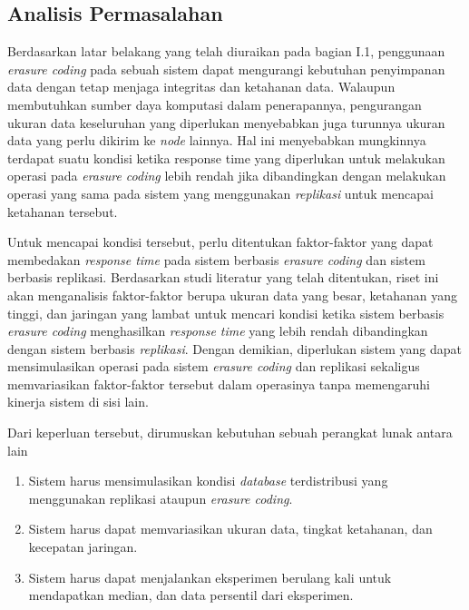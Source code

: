 \subsection{Analisis Permasalahan}
\label{sec:analisis-permasalahan}

Berdasarkan latar belakang yang telah diuraikan pada bagian I.1, penggunaan \textit{erasure coding} pada sebuah sistem dapat mengurangi kebutuhan penyimpanan data dengan tetap menjaga integritas dan ketahanan data. Walaupun membutuhkan sumber daya komputasi dalam penerapannya, pengurangan ukuran data keseluruhan yang diperlukan menyebabkan juga turunnya ukuran data yang perlu dikirim ke \textit{node} lainnya. Hal ini menyebabkan mungkinnya terdapat suatu kondisi ketika {response time} yang diperlukan untuk melakukan operasi pada \textit{erasure coding} lebih rendah jika dibandingkan dengan melakukan operasi yang sama pada sistem yang menggunakan \textit{replikasi} untuk mencapai ketahanan tersebut.

Untuk mencapai kondisi tersebut, perlu ditentukan faktor-faktor yang dapat membedakan \textit{response time} pada sistem berbasis \textit{erasure coding} dan sistem berbasis replikasi. Berdasarkan studi literatur yang telah ditentukan, riset ini akan menganalisis faktor-faktor berupa ukuran data yang besar, ketahanan yang tinggi, dan jaringan yang lambat untuk mencari kondisi ketika sistem berbasis \textit{erasure coding} menghasilkan \textit{response time} yang lebih rendah dibandingkan dengan sistem berbasis \textit{replikasi}. Dengan demikian, diperlukan sistem yang dapat mensimulasikan operasi pada sistem \textit{erasure coding} dan replikasi sekaligus memvariasikan faktor-faktor tersebut dalam operasinya tanpa memengaruhi kinerja sistem di sisi lain.

Dari keperluan tersebut, dirumuskan kebutuhan sebuah perangkat lunak antara lain
\begin{enumerate}

    \item Sistem harus mensimulasikan kondisi \textit{database} terdistribusi yang menggunakan replikasi ataupun \textit{erasure coding}.
    \item Sistem harus dapat memvariasikan ukuran data, tingkat ketahanan, dan kecepatan jaringan.
    \item Sistem harus dapat  menjalankan eksperimen berulang kali untuk mendapatkan median, dan data persentil dari eksperimen.

\end{enumerate}
  